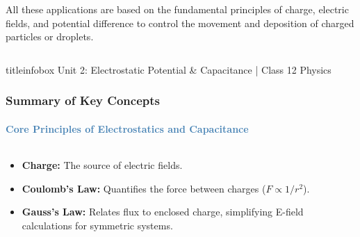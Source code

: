 \begin{frame}
\begin{frame}
\begin{columns}[T]
    \vspace{0.3cm}
    
    \begin{importantbox}
    \vspace{0.1cm}
    All these applications are based on the fundamental principles of charge, electric fields, and potential difference to control the movement and deposition of charged particles or droplets.
    \vspace{0.1cm}
    \end{importantbox}
    
\end{columns}

\vfill

\begin{beamercolorbox}[wd=\textwidth,ht=0.5cm,dp=0.1cm,center]{titleinfobox}
    \small\color{coolgray} Unit 2: Electrostatic Potential & Capacitance | Class 12 Physics
\end{beamercolorbox}
\end{frame}

\begin{frame}
\frametitle{\textsf{\textbf{Summary of Key Concepts}}}
\framesubtitle{\textcolor{steelblue}{Core Principles of Electrostatics and Capacitance}}

\begin{columns}[T]
    \begin{keybox}
    \vspace{0.1cm}
    \begin{itemize}
        \item \textbf{Charge:} The source of electric fields.
        \item \textbf{Coulomb's Law:} Quantifies the force between charges ($F \propto 1/r^2$).
        \item \textbf{Gauss's Law:} Relates flux to enclosed charge, simplifying E-field calculations for symmetric systems.
    \end{itemize}
    \end{keybox}
    

\end{columns}
\end{frame}
\end{frame}
